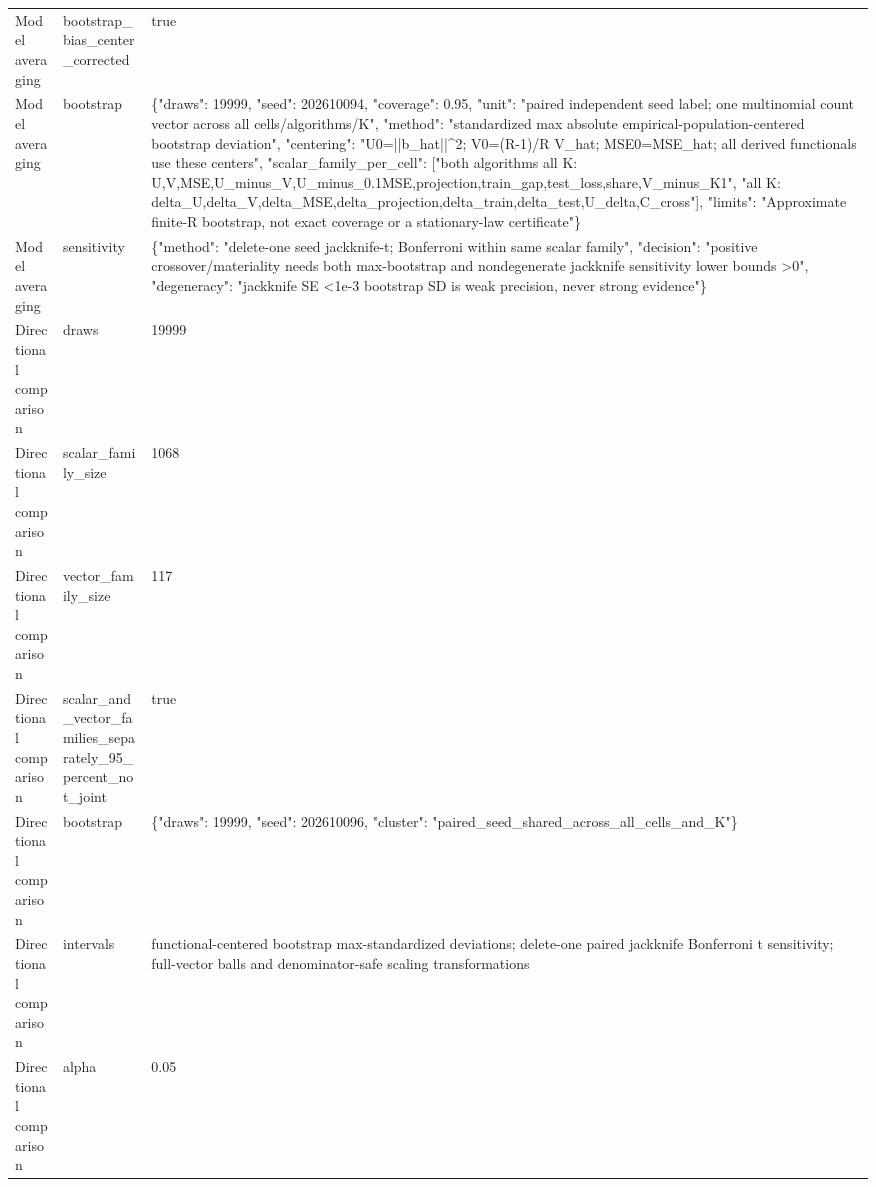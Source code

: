 \begin{tabular}{lll}
Model averaging & bootstrap\_bias\_center\_corrected & true \\
Model averaging & bootstrap & \{"draws": 19999, "seed": 202610094, "coverage": 0.95, "unit": "paired independent seed label; one multinomial count vector across all cells/algorithms/K", "method": "standardized max absolute empirical-population-centered bootstrap deviation", "centering": "U0=||b\_hat||\textasciicircum{}2; V0=(R-1)/R V\_hat; MSE0=MSE\_hat; all derived functionals use these centers", "scalar\_family\_per\_cell": ["both algorithms all K: U,V,MSE,U\_minus\_V,U\_minus\_0.1MSE,projection,train\_gap,test\_loss,share,V\_minus\_K1", "all K: delta\_U,delta\_V,delta\_MSE,delta\_projection,delta\_train,delta\_test,U\_delta,C\_cross"], "limits": "Approximate finite-R bootstrap, not exact coverage or a stationary-law certificate"\} \\
Model averaging & sensitivity & \{"method": "delete-one seed jackknife-t; Bonferroni within same scalar family", "decision": "positive crossover/materiality needs both max-bootstrap and nondegenerate jackknife sensitivity lower bounds >0", "degeneracy": "jackknife SE <1e-3 bootstrap SD is weak precision, never strong evidence"\} \\
Directional comparison & draws & 19999 \\
Directional comparison & scalar\_family\_size & 1068 \\
Directional comparison & vector\_family\_size & 117 \\
Directional comparison & scalar\_and\_vector\_families\_separately\_95\_percent\_not\_joint & true \\
Directional comparison & bootstrap & \{"draws": 19999, "seed": 202610096, "cluster": "paired\_seed\_shared\_across\_all\_cells\_and\_K"\} \\
Directional comparison & intervals & functional-centered bootstrap max-standardized deviations; delete-one paired jackknife Bonferroni t sensitivity; full-vector balls and denominator-safe scaling transformations \\
Directional comparison & alpha & 0.05 \\
\end{tabular}
